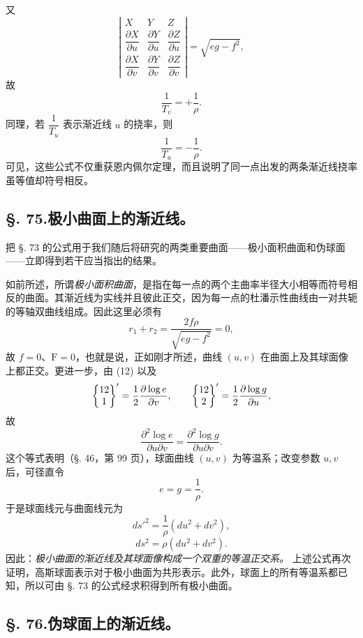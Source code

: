又
\[
\left|\begin{matrix}
X&Y&Z\\[0.25em]
\dfrac{\partial X}{\partial u}&\dfrac{\partial Y}{\partial u}&\dfrac{\partial Z}{\partial u}\\[0.65em]
\dfrac{\partial X}{\partial v}&\dfrac{\partial Y}{\partial v}&\dfrac{\partial Z}{\partial v}
\end{matrix}\right|=\sqrt{eg-f^2},
\]
故
\begin{equation}\tag{15}
 \frac1{T_v}=+\frac1{\rho}.
\end{equation}
同理，若 \(\dfrac1{T_u}\) 表示渐近线 \(u\) 的挠率，则
\begin{equation}\tag{15*}
 \frac1{T_u}=-\frac1{\rho}.
\end{equation}
可见，这些公式不仅重获恩内佩尔定理，而且说明了同一点出发的两条渐近线挠率虽等值却符号相反。

\subsection*{\S. 75.\quad 极小曲面上的渐近线。}

把 \S. 73 的公式用于我们随后将研究的两类重要曲面——极小面积曲面和伪球面——立即得到若干应当指出的结果。

如前所述，所谓\emph{极小面积曲面}，是指在每一点的两个主曲率半径大小相等而符号相反的曲面。其渐近线为实线并且彼此正交，因为每一点的杜潘示性曲线由一对共轭的等轴双曲线组成。因此这里必须有
\[
 r_1+r_2=\frac{2f\rho}{\sqrt{eg-f^2}}=0,
\]
故 \(f=0\)、\(\mathrm F=0\)，也就是说，正如刚才所述，曲线 \((u,v)\) 在曲面上及其球面像上都正交。更进一步，由 (12) 以及
\[
\left\{\begin{matrix}12\\1\end{matrix}\right\}'=\frac12\frac{\partial\log e}{\partial v},\qquad
\left\{\begin{matrix}12\\2\end{matrix}\right\}'=\frac12\frac{\partial\log g}{\partial u},
\]
故
\[
 \frac{\partial^2\log e}{\partial u\partial v}=\frac{\partial^2\log g}{\partial u\partial v}.
\]
这个等式表明（\S. 46，第 99 页），球面曲线 \((u,v)\) 为等温系；改变参数 \(u,v\) 后，可径直令
\[
 e=g=\frac1{\rho}.
\]
于是球面线元与曲面线元为
\[
 ds'^2=\frac1{\rho}(du^2+dv^2),
\]
\[
 ds^2=\rho(du^2+dv^2).
\]
因此：\emph{极小曲面的渐近线及其球面像构成一个双重的等温正交系。} 上述公式再次证明，高斯球面表示对于极小曲面为共形表示。此外，球面上的所有等温系都已知，所以可由 \S. 73 的公式经求积得到所有极小曲面。

\subsection*{\S. 76.\quad 伪球面上的渐近线。}

